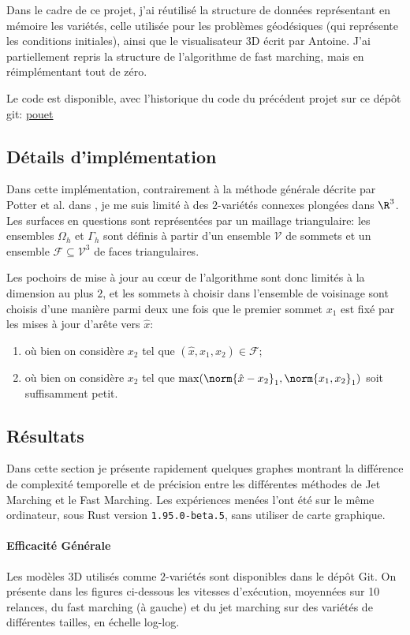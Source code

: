 \documentclass[math, info]{mpb-cours}
\begin{document}
\smallskip

Dans le cadre de ce projet, j'ai réutilisé la structure de données représentant en mémoire les variétés,
celle utilisée pour les problèmes géodésiques (qui représente les conditions initiales),
ainsi que le visualisateur 3D écrit par Antoine.
J'ai partiellement repris la structure de l'algorithme de fast marching, mais en réimplémentant tout de
zéro.

Le code est disponible, avec l'historique du code du précédent projet sur ce dépôt git: \url{pouet}

\subsection{Détails d'implémentation}
Dans cette implémentation, contrairement à la méthode générale décrite par Potter et al. dans
\cite{potter2021jetmarchingmethodssolving}, je me suis limité à des $2$-variétés connexes plongées
dans $\R^{3}$.
Les surfaces en questions sont représentées par un maillage triangulaire: les ensembles $\Omega_{h}$ et
$\Gamma_{h}$ sont définis à partir d'un ensemble $\mathcal{V}$ de sommets et un ensemble
$\mathcal{F}\subseteq \mathcal{V}^{3}$ de faces triangulaires.

Les pochoirs de mise à jour au c\oe ur de l'algorithme sont donc limités à la dimension au plus $2$, et les
sommets à choisir dans l'ensemble de voisinage sont choisis d'une manière parmi deux une fois que le premier
sommet $x_{1}$ est fixé par les mises à jour d'arête vers $\hat{x}$:
\begin{enumerate}
	\item où bien on considère $x_{2}$ tel que $(\hat{x}, x_{1}, x_{2}) \in \mathcal{F}$;
	\item où bien on considère $x_{2}$ tel que $\max(\norm{\hat{x} - x_{2}}_{1}, \norm{x_{1}, x_{2}}_{1})$
	      soit suffisamment petit.
\end{enumerate}

\subsection{Résultats}
Dans cette section je présente rapidement quelques graphes montrant la différence de complexité temporelle
et de précision entre les différentes méthodes de Jet Marching et le Fast Marching.
Les expériences menées l'ont été sur le même ordinateur, sous Rust version \texttt{1.95.0-beta.5},
sans utiliser de carte graphique.


\paragraph*{Efficacité Générale}
Les modèles 3D utilisés comme $2$-variétés sont disponibles dans le dépôt Git.
On présente dans les figures ci-dessous les vitesses d'exécution, moyennées sur 10 relances, du fast
marching (à gauche) et du jet marching sur des variétés de différentes tailles, en échelle log-log.
\end{document}
